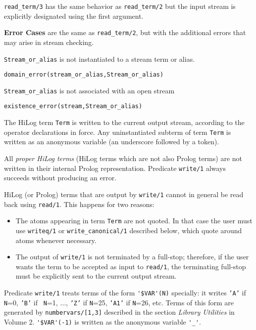 \begin{description}

%
{\tt read\_term/3} has the same behavior as {\tt read\_term/2} but
the input stream is explicitly designated using the first argument.

{\bf Error Cases} are the same as {\tt read\_term/2}, but with the
additional errors that may arise in stream checking.
\bi
\item 	{\tt Stream\_or\_alias} is not instantiated to a stream term or alias.
\bi
\item 	{\tt domain\_error(stream\_or\_alias,Stream\_or\_alias)}
\ei
\item 	{\tt Stream\_or\_alias} is not associated with an open stream
\bi
\item 	{\tt existence\_error(stream,Stream\_or\_alias)}
\ei
\ei

    The HiLog term {\tt Term} is written to the current output stream, 
    according to the operator declarations in force.  Any uninstantiated 
    subterm of term {\tt Term} is written as an anonymous variable (an 
    underscore followed by a token).

    All {\em proper HiLog terms} (HiLog terms which are not also Prolog terms) 
    are not written in their internal Prolog representation.  Predicate 
    {\tt write/1} always succeeds without producing an error.

    HiLog (or Prolog) terms that are output by {\tt write/1} cannot in general be 
    read back using {\tt read/1}.  This happens for two reasons:
    \begin{itemize}
    \item The atoms appearing in term {\tt Term} are not quoted. In that case 
          the user must use {\tt writeq/1} or 
          {\tt write\_canonical/1} described below, which quote around atoms 
          whenever necessary.
    \item The output of {\tt write/1} is not terminated by a full-stop;
          therefore, if the user wants the term to be accepted as input to
          {\tt read/1}, the terminating full-stop must be explicitly sent 
          to the current output stream. 
    \end{itemize}

    Predicate {\tt write/1} treats terms of the form \verb|'$VAR'(N)|
    specially: it writes {\tt 'A'} if {\tt N}=0, {\tt 'B'} if {\tt
    N}=1, $\ldots$, {\tt 'Z'} if {\tt N}=25, {\tt 'A1'} if {\tt N}=26,
    etc.  Terms of this form are generated by {\tt numbervars/[1,3]}
    described in the section {\it Library Utilities} in Volume 2.
    \verb|'$VAR'(-1)| is written as the anonymous variable \verb|'_'|.


\end{description}
